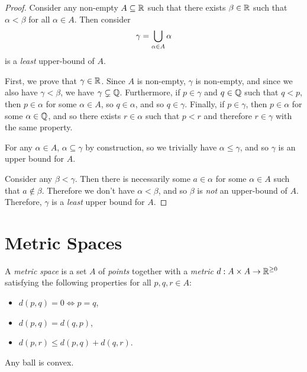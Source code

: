 \begin{proof}
    Consider any non-empty $A \subseteq \mathbb{R}$ such that there exists $\beta \in \mathbb{R}$ such that $\alpha < \beta$ for all $\alpha \in A$. Then consider
    \begin{align*}
        \gamma = \bigcup_{\alpha\in A}\alpha
    \end{align*}
    is a \emph{least} upper-bound of $A$.

    First, we prove that $\gamma \in \mathbb{R}$. Since $A$ is non-empty, $\gamma$ is non-empty, and since we also have $\gamma < \beta$, we have $\gamma \subsetneq \mathbb{Q}$. Furthermore, if $p \in \gamma$ and $q \in \mathbb{Q}$ such that $q < p$, then $p \in \alpha$ for some $\alpha \in A$, so $q \in \alpha$, and so $q \in \gamma$. Finally, if $p \in \gamma$, then $p \in \alpha$ for some $\alpha \in \mathbb{Q}$, and so there exists $r \in \alpha$ such that $p < r$ and therefore $r \in \gamma$ with the same property.

    For any $\alpha \in A$, $\alpha \subseteq \gamma$ by construction, so we trivially have $\alpha \leq \gamma$, and so $\gamma$ is an upper bound for $A$.

    Consider any $\beta < \gamma$. Then there is necessarily some $a \in \alpha$ for some $\alpha \in A$ such that $a \not\in \beta$. Therefore we don't have $\alpha < \beta$, and so $\beta$ is \emph{not} an upper-bound of $A$. Therefore, $\gamma$ is a \emph{least} upper bound for $A$.
\end{proof}

\section{Metric Spaces}

\begin{defn}
    A \emph{metric space} is a set $A$ of \emph{points} together with a \emph{metric} $d: A \times A \to \mathbb{R}^{\geq 0}$ satisfying the following properties for all $p, q, r \in A$:
    \begin{itemize}
        \item $d(p, q) = 0 \iff p = q$,
        \item $d(p, q) = d(q, p)$,
        \item $d(p, r) \leq d(p, q) + d(q, r)$.
    \end{itemize}
\end{defn}

\begin{prop}
    Any ball is convex.
\end{prop}

